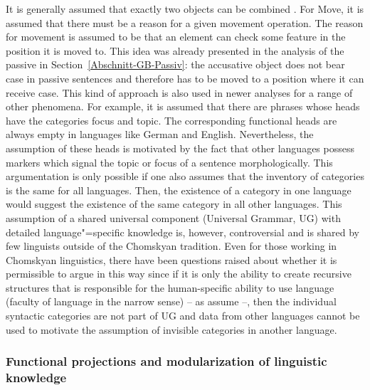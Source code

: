 It is generally assumed that exactly two objects can be combined \citep[]{Chomsky95a-u}.
For Move, it is assumed that there must be a reason for a given movement operation. The reason for
movement is assumed to be that an element can check some feature in the position it is moved to. This idea was already presented in the analysis of the passive in
Section~\ref{Abschnitt-GB-Passiv}: the accusative object does not bear case in passive sentences and therefore has to be moved to a position
where it can receive case. This kind of approach is also used in newer analyses for a range of other phenomena. For example, it is assumed that
there are phrases whose heads have the categories focus and topic. The
corresponding functional heads are always empty in languages like German and English.
Nevertheless, the assumption of these heads is motivated by the fact that other languages possess
markers which signal the topic or focus of a sentence morphologically. This argumentation is only
possible if one also assumes that the inventory of categories is the same for all languages. Then,
the existence of a category in one language would suggest the existence of the same category in all
other languages. This assumption of a shared universal component (Universal Grammar, UG)\indexug
with detailed language"=specific knowledge is, however, controversial and is shared by few linguists
outside of the Chomskyan tradition. Even for those working in Chomskyan linguistics, there have been
questions raised about whether it is permissible to argue in this way since if it is only the ability to create recursive structures that is responsible for the
human-specific ability to use language (faculty of language in the narrow sense) -- as \citet*{HCF2002a}
assume --, then the individual syntactic categories are not part of UG and data from other languages cannot be used
to motivate the assumption of invisible categories in another language.

\subsubsection{Functional projections and modularization of linguistic knowledge}

